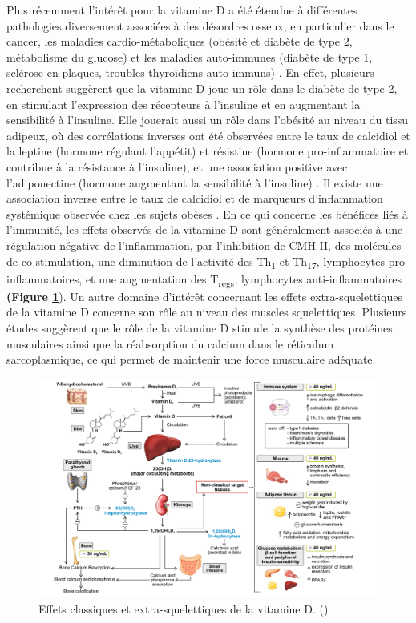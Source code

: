 \documentclass[
  a4paper,
  DIV=11,
  numbers=noendperiod,
  listof=totoc]{scrreprt}
\begin{document}
Plus récemment l'intérêt pour la vitamine D a été étendue à différentes
pathologies diversement associées à des désordres osseux, en particulier
dans le cancer, les maladies cardio-métaboliques (obésité et diabète de
type 2, métabolisme du glucose) et les maladies auto-immunes (diabète de
type 1, sclérose en plaques, troubles thyroïdiens auto-immuns)
\autocite{Dankers.2017,Caprio.2017}. En effet, plusieurs recherchent
suggèrent que la vitamine D joue un rôle dans le diabète de type 2, en
stimulant l'expression des récepteurs à l'insuline et en augmentant la
sensibilité à l'insuline. Elle jouerait aussi un rôle dans l'obésité au
niveau du tissu adipeux, où des corrélations inverses ont été observées
entre le taux de calcidiol et la leptine (hormone régulant l'appétit) et
résistine (hormone pro-inflammatoire et contribue à la résistance à
l'insuline), et une association positive avec l'adiponectine (hormone
augmentant la sensibilité à l'insuline)
\autocite{Caprio.2017,Bellia.2013}. Il existe une association inverse
entre le taux de calcidiol et de marqueurs d'inflammation systémique
observée chez les sujets obèses \autocite{Bellia.2013}. En ce qui
concerne les bénéfices liés à l'immunité, les effets observés de la
vitamine D sont généralement associés à une régulation négative de
l'inflammation, par l'inhibition de \ac{CMH-II}, des molécules de
co-stimulation, une diminution de l'activité des Th\textsubscript{1} et
Th\textsubscript{17}, lymphocytes pro-inflammatoires, et une
augmentation des T\textsubscript{regs}, lymphocytes anti-inflammatoires
\textbf{(Figure \ref{fig:extra-skeletal}}). Un autre domaine d'intérêt
concernant les effets extra-squelettiques de la vitamine D concerne son
rôle au niveau des muscles squelettiques. Plusieurs études suggèrent que
le rôle de la vitamine D stimule la synthèse des protéines musculaires
ainsi que la réabsorption du calcium dans le réticulum sarcoplasmique,
ce qui permet de maintenir une force musculaire adéquate.

\begin{landscape}
\begin{figure}
\includegraphics{figures/extra-skeletal-effect.png} 
\caption[\textbf{Effets classiques et extra-squelettiques de la vitamine D.}]
{Effets classiques et extra-squelettiques de la vitamine D. (\cite{Caprio.2017})}
\label{fig:extra-skeletal}
\end{figure}
\end{landscape}
\end{document}
